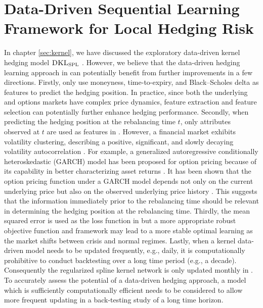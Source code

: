 \documentclass[letterpaper,12pt,titlepage,oneside,final]{book}
\numberwithin{equation}{section}
\theoremstyle{definition}
\newcommand{\DKLs}{\bf\textsc{DKL}_{\text{SPL}}}
\begin{document}
\chapter{Data-Driven Sequential Learning Framework for Local Hedging Risk}
\label{sec:RNNLocal}
In chapter \ref{sec:kernel}, we have discussed the exploratory data-driven kernel hedging  model $\DKLs$ \cite{knian2017}. However, we believe that the data-driven hedging learning approach in \cite{knian2017} can potentially benefit from further improvements in a few directions.
Firstly,  \citet{knian2017}  only use moneyness, time-to-expiry, and Black–Scholes delta as features to predict the hedging position. In practice, since both the underlying and options markets have complex price dynamics,
 feature extraction and feature selection can potentially further enhance hedging performance.
Secondly, when predicting the hedging position at the rebalancing time $t$, only attributes observed at $t$ are used as features in \cite{knian2017}.  However, a financial market exhibits volatility clustering,   describing a positive, significant, and slowly decaying volatility autocorrelation  \citep{mandelbrot1963variation}.  For example,  a generalized autoregressive conditionally heteroskedastic (GARCH) model has been proposed for option pricing because of its capability in better characterizing asset returns \citep{heston2000closed} .  It has been shown that the option pricing function under a GARCH model depends not only on the current underlying price but also on the observed underlying price history \citep{duan2006approximating,heston2000closed}.   This suggests that the information immediately prior to the rebalancing time should be relevant in determining the hedging position at the rebalancing time.
Thirdly,  the mean squared error is used as the loss function in \cite{knian2017} but
a more appropriate robust objective function and framework may lead to a more stable optimal learning as the market shifts between crisis and normal regimes.
Lastly, when a kernel data-driven model needs to be updated frequently, e.g., daily, it is computationally prohibitive to conduct backtesting over a long time period (e.g., a decade). 
Consequently the regularized spline kernel network is only updated monthly in  \cite{knian2017}.  To accurately assess the potential of a data-driven hedging approach,  a model which is sufficiently computationally efficient needs to be considered to allow more frequent updating in a back-testing study of a long time horizon.
\end{document}
